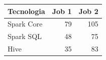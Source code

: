 \begin{tabular}{@{}l r r@{}}
\toprule
Tecnologia & Job 1 & Job 2 \\
\midrule
Spark Core & 79 & 105 \\
Spark SQL & 48 & 75 \\
Hive & 35 & 83 \\
\bottomrule
\end{tabular}